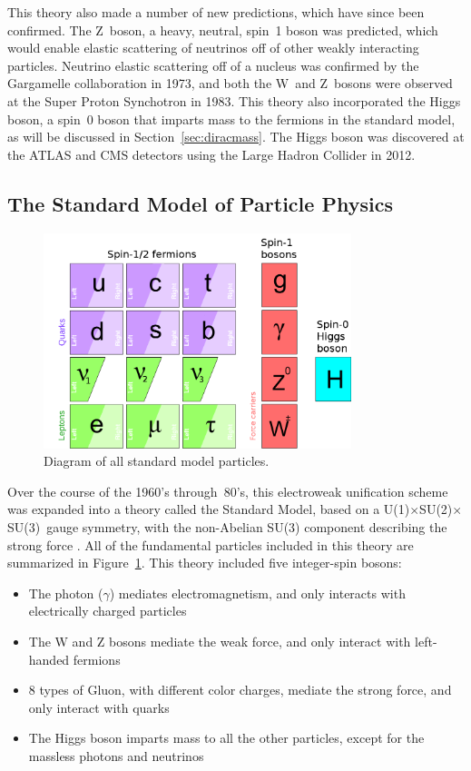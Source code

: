\documentclass[/main.tex]{subfiles}
\begin{document}
This theory also made a number of new predictions, which have since been confirmed.
The Z~boson, a heavy, neutral, spin~1 boson was predicted, which would enable elastic scattering of neutrinos off of other weakly interacting particles.
Neutrino elastic scattering off of a nucleus was confirmed by the Gargamelle collaboration in 1973\cite{Gargamelle1973}, and both the W~and Z~bosons were observed at the Super Proton Synchotron in 1983\cite{Arnison1983, Bagnaia1983}.
This theory also incorporated the Higgs boson, a spin~0 boson that imparts mass to the fermions in the standard model, as will be discussed in Section~\ref{sec:diracmass}.
The Higgs boson was discovered at the ATLAS and CMS detectors using the Large Hadron Collider in 2012\cite{ATLAS2012, CMS2012}.

\subsection{The Standard Model of Particle Physics} \label{sec:SM}
\begin{figure}[t]
  \centering
  \includegraphics[width=0.8\textwidth]{SM}
  \caption[Standard Model Particles]{\label{fig:SM}
    Diagram of all standard model particles.
  }
\end{figure}
Over the course of the 1960's through~80's, this electroweak unification scheme was expanded into a theory called the Standard Model, based on a U(1)$\times$SU(2)$\times$SU(3)~gauge symmetry, with the non-Abelian SU(3) component describing the strong force \cite{PDG2018}.
All of the fundamental particles included in this theory are summarized in Figure~\ref{fig:SM}.
This theory included five integer-spin bosons:
\begin{itemize}
\item The photon ($\gamma$) mediates electromagnetism, and only interacts with electrically charged particles
\item The W and Z bosons mediate the weak force, and only interact with left-handed fermions
\item 8 types of Gluon, with different color charges, mediate the strong force, and only interact with quarks
\item The Higgs boson imparts mass to all the other particles, except for the massless photons and neutrinos
\end{itemize}
\end{document}
